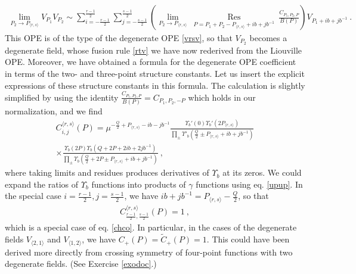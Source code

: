 \documentclass[12pt, a4paper, notitlepage, twoside]{report}
\numberwithin{equation}{section}
\theoremstyle{break}
\begin{document}
\begin{align}
\underset{P_2\to P_{\langle r,s \rangle}}{\lim} V_{P_1}V_{P_2} \sim \sum_{i=-\frac{r-1}{2}}^{\frac{r-1}{2}} \sum_{j=-\frac{s-1}{2}}^{\frac{s-1}{2}}
 \left(\underset{P_2\to P_{\langle r,s \rangle}}{\lim}\ \underset{P=P_1+P_2-P_{\langle r,s \rangle}+ib+jb^{-1}}{\operatorname{ Res}}\ \frac{C_{P_1,P_2,P}}{B(P)}\right) V_{P_1 + ib+jb^{-1}}\ .
\label{crs}
\end{align}
This OPE is of the type of the degenerate OPE \eqref{vrsv}, so that $V_{P_2}$ becomes a degenerate field, whose fusion rule \eqref{rtv} we have now rederived from the Liouville OPE.
Moreover, we have obtained a formula for the degenerate OPE coefficient in terms of the two- and three-point structure constants. Let us insert the explicit expressions of these structure constants in this formula. The calculation is slightly simplified by using the identity $\frac{C_{P_1,P_2,P}}{B(P)} = C_{P_1,P_2,-P}$ which holds in our normalization, and we find
\begin{multline}
 C_{i,j}^{\langle r,s \rangle}(P) = \mu^{-\frac{Q}{2}+P_{\langle r,s\rangle}-ib-jb^{-1}} 
 \frac{\Upsilon_b'(0)\Upsilon_b'(2P_{\langle r,s \rangle})}{\prod_{\pm}\Upsilon'_b(\frac{Q}{2}\pm P_{\langle r,s\rangle} +ib+jb^{-1})} 
 \\ \times 
 \frac{\Upsilon_b(2P)\Upsilon_b(Q+2P+2ib+2jb^{-1})}{\prod_\pm \Upsilon_b(\frac{Q}{2}+2P\pm P_{\langle r,s\rangle} +ib+jb^{-1})}
 \ ,
\end{multline}
where taking limits and residues produces derivatives of $\Upsilon_b$ at its zeros.
We could expand the ratios of $\Upsilon_b$ functions into products of $\gamma$ functions using eq. \eqref{upup}.
In the special case $i=\frac{r-1}{2}, j=\frac{s-1}{2}$, we have $ib+jb^{-1} = P_{\langle r,s\rangle}-\frac{Q}{2} $, so that 
\begin{align}
 C_{\frac{r-1}{2},\frac{s-1}{2}}^{\langle r,s \rangle}(P) = 1 \ ,
 \label{cco}
\end{align}
which is a special case of eq. \eqref{chco}.
In particular, in the cases of the degenerate fields $V_{\langle 2,1\rangle}$ and $V_{\langle 1,2\rangle}$, we have $C_+(P)=\tilde{C}_+(P)=1$. This could have been derived more directly from crossing symmetry of four-point functions with two degenerate fields. 
(See Exercise \ref{exodoc}.) 
\end{document}
